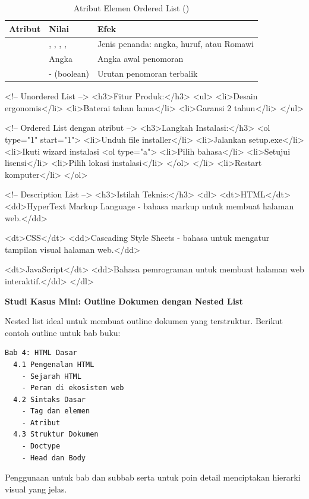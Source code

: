 \begin{table}[htbp]
\centering
\begin{tabular}{|P{3cm}|P{2.5cm}|P{6cm}|}
\hline
\textbf{Atribut} & \textbf{Nilai} & \textbf{Efek} \\
\hline
{} & , , , ,  & Jenis penanda: angka, huruf, atau Romawi \\
\hline
{} & Angka & Angka awal penomoran \\
\hline
{} & - (boolean) & Urutan penomoran terbalik \\
\hline
\end{tabular}
\caption{Atribut Elemen Ordered List ()}
\label{tab:ol-attributes}
\end{table}

\begin{webcode}[language=HTML, caption={Contoh Berbagai Jenis Daftar}]
<!-- Unordered List -->
<h3>Fitur Produk:</h3>
<ul>
  <li>Desain ergonomis</li>
  <li>Baterai tahan lama</li>
  <li>Garansi 2 tahun</li>
</ul>

<!-- Ordered List dengan atribut -->
<h3>Langkah Instalasi:</h3>
<ol type="1" start="1">
  <li>Unduh file installer</li>
  <li>Jalankan setup.exe</li>
  <li>Ikuti wizard instalasi
    <ol type="a">
      <li>Pilih bahasa</li>
      <li>Setujui lisensi</li>
      <li>Pilih lokasi instalasi</li>
    </ol>
  </li>
  <li>Restart komputer</li>
</ol>

<!-- Description List -->
<h3>Istilah Teknis:</h3>
<dl>
  <dt>HTML</dt>
  <dd>HyperText Markup Language - bahasa markup 
      untuk membuat halaman web.</dd>
  
  <dt>CSS</dt>
  <dd>Cascading Style Sheets - bahasa untuk 
      mengatur tampilan visual halaman web.</dd>
  
  <dt>JavaScript</dt>
  <dd>Bahasa pemrograman untuk membuat halaman 
      web interaktif.</dd>
</dl>
\end{webcode}

\begin{contoh}
\textbf{Studi Kasus Mini: Outline Dokumen dengan Nested List}

Nested list ideal untuk membuat outline dokumen yang terstruktur. Berikut contoh outline untuk bab buku:

\begin{verbatim}
Bab 4: HTML Dasar
  4.1 Pengenalan HTML
    - Sejarah HTML
    - Peran di ekosistem web
  4.2 Sintaks Dasar
    - Tag dan elemen
    - Atribut
  4.3 Struktur Dokumen
    - Doctype
    - Head dan Body
\end{verbatim}

Penggunaan  untuk bab dan subbab serta  untuk poin detail menciptakan hierarki visual yang jelas.
\end{contoh}


